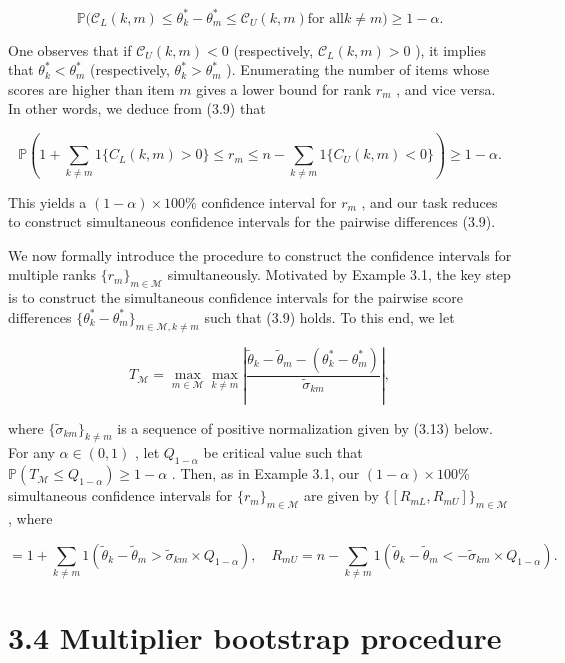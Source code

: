 \[
\mathbb{P}\Big(\mathcal{C}_L(k,m) \leq \theta_k^* - \theta_m^* \leq \mathcal{C}_U(k,m) \text{for all} k \neq m\Big) \geq 1 - \alpha . \tag{3.9}
\]

One observes that if \(\mathcal{C}_U(k,m) < 0\) (respectively,
\(\mathcal{C}_L(k,m) > 0\) ), it implies that
\(\theta_k^* < \theta_m^*\) (respectively, \(\theta_k^* > \theta_m^*\)
). Enumerating the number of items whose scores are higher than item
\(m\) gives a lower bound for rank \(r_{m}\) , and vice versa. In other
words, we deduce from (3.9) that

\[
\mathbb{P}\left(1 + \sum_{k \neq m} 1 \{C_L(k,m) > 0\} \leq r_m \leq n - \sum_{k \neq m} 1 \{C_U(k,m) < 0\}\right) \geq 1 - \alpha . \tag{3.10}
\]

This yields a \((1 - \alpha) \times 100\%\) confidence interval for
\(r_{m}\) , and our task reduces to construct simultaneous confidence
intervals for the pairwise differences (3.9).

We now formally introduce the procedure to construct the confidence
intervals for multiple ranks \(\{r_m\}_{m \in \mathcal{M}}\)
simultaneously. Motivated by Example 3.1, the key step is to construct
the simultaneous confidence intervals for the pairwise score differences
\(\{\theta_k^* - \theta_m^*\}_{m \in \mathcal{M}, k \neq m}\) such that
(3.9) holds. To this end, we let

\[
T_{\mathcal{M}} = \max_{m \in \mathcal{M}} \max_{k \neq m} \left| \frac{\widetilde{\theta}_k - \widetilde{\theta}_m - (\theta_k^* - \theta_m^*)}{\widetilde{\sigma}_{km}} \right|, \tag{3.11}
\]

where \(\{\widetilde{\sigma}_{km}\}_{k \neq m}\) is a sequence of
positive normalization given by (3.13) below. For any
\(\alpha \in (0,1)\) , let \(Q_{1 - \alpha}\) be critical value such
that \(\mathbb{P}(T_{\mathcal{M}} \leq Q_{1 - \alpha}) \geq 1 - \alpha\)
. Then, as in Example 3.1, our \((1 - \alpha) \times 100\%\)
simultaneous confidence intervals for \(\{r_m\}_{m \in \mathcal{M}}\)
are given by \(\{[R_{mL}, R_{mU}] \}_{m \in \mathcal{M}}\) , where

\[
= 1 + \sum_{k \neq m} 1 \left(\widetilde{\theta}_k - \widetilde{\theta}_m > \widetilde{\sigma}_{km} \times Q_{1 - \alpha}\right), \quad R_{mU} = n - \sum_{k \neq m} 1 \left(\widetilde{\theta}_k - \widetilde{\theta}_m < -\widetilde{\sigma}_{km} \times Q_{1 - \alpha}\right).
\]

\section{3.4 Multiplier bootstrap
procedure}\label{multiplier-bootstrap-procedure}

